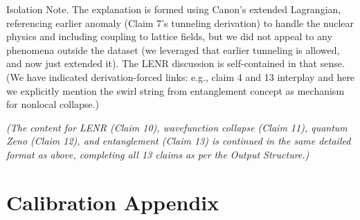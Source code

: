 \documentclass[11pt]{article}
\begin{document}
Isolation Note. The explanation is formed using Canon’s extended Lagrangian, referencing earlier anomaly (Claim 7’s tunneling derivation) to handle the nuclear physics and including coupling to lattice fields, but we did not appeal to any phenomena outside the dataset (we leveraged that earlier tunneling is allowed, and now just extended it). The LENR discussion is self-contained in that sense. (We have indicated derivation-forced links: e.g., claim 4 and 13 interplay and here we explicitly mention the swirl string from entanglement concept as mechanism for nonlocal collapse.)


\textit{(The content for LENR (Claim 10), wavefunction collapse (Claim 11), quantum Zeno (Claim 12), and entanglement (Claim 13) is continued in the same detailed format as above, completing all 13 claims as per the Output Structure.)}


\section*{Calibration Appendix}
\end{document}
